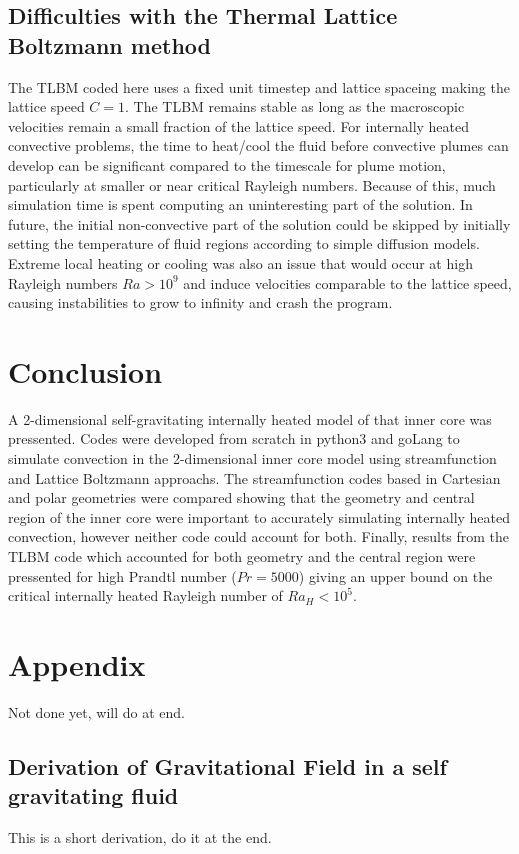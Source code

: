 \documentclass{article}
\begin{document}
\subsection*{Difficulties with the Thermal Lattice Boltzmann method}
The TLBM coded here uses a fixed unit timestep and lattice spaceing making the lattice speed $C=1$. The TLBM remains stable as long as the macroscopic velocities remain a small fraction of the lattice speed. For internally heated convective problems, the time to heat/cool the fluid before convective plumes can develop can be significant compared to the timescale for plume motion, particularly at smaller or near critical Rayleigh numbers. Because of this, much simulation time is spent computing an uninteresting part of the solution. In future, the initial non-convective part of the solution could be skipped by initially setting the temperature of fluid regions according to simple diffusion models.
\newline
\noindent Extreme local heating or cooling was also an issue that would occur at high Rayleigh numbers $Ra>10^9$ and induce velocities comparable to the lattice speed, causing instabilities to grow to infinity and crash the program.
\newline



\section*{Conclusion}
A 2-dimensional self-gravitating internally heated model of that inner core was pressented. Codes were developed from scratch in python3 and goLang to simulate convection in the 2-dimensional inner core model using streamfunction and Lattice Boltzmann approachs. The streamfunction codes based in Cartesian and polar geometries were compared showing that the geometry and central region of the inner core were important to accurately simulating internally heated convection, however neither code could account for both. Finally, results from the TLBM code which accounted for both geometry and the central region were pressented for high Prandtl number ($Pr=5000$) giving an upper bound on the critical internally heated Rayleigh number of $Ra_H < 10^5$. 


\section*{Appendix}
Not done yet, will do at end.
\subsection*{Derivation of Gravitational Field in a self gravitating fluid}
This is a short derivation, do it at the end. 
\end{document}
